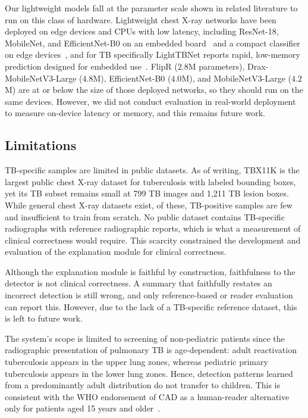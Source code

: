 \documentclass[conference, letterpaper]{IEEEtran}
\begin{document}
Our lightweight models fall at the parameter scale shown in related literature to run on this class of hardware. Lightweight chest X-ray networks have been deployed on edge devices and CPUs with low latency, including ResNet-18, MobileNet, and EfficientNet-B0 on an embedded board~\cite{benmalek2025edge} and a compact classifier on edge devices~\cite{chauhan2024covid_edge}, and for TB specifically LightTBNet reports rapid, low-memory prediction designed for embedded use~\cite{capellan2023lighttbnet}. FlipR ($2.8$M parameters), Drax-MobileNetV3-Large ($4.8$M), EfficientNet-B0 ($4.0$M), and MobileNetV3-Large ($4.2$M) are at or below the size of those deployed networks, so they should run on the same devices. However, we did not conduct evaluation in real-world deployment to measure on-device latency or memory, and this remains future work.

\subsection{Limitations}

TB-specific samples are limited in public datasets. As of writing, TBX11K is the largest public chest X-ray dataset for tuberculosis with labeled bounding boxes, yet its TB subset remains small at 799 TB images and 1,211 TB lesion boxes. While general chest X-ray datasets exist, of these, TB-positive samples are few and insufficient to train from scratch. No public dataset contains TB-specific radiographs with reference radiographic reports, which is what a measurement of clinical correctness would require. This scarcity constrained the development and evaluation of the explanation module for clinical correctness.

Although the explanation module is faithful by construction, faithfulness to the detector is not clinical correctness. A summary that faithfully restates an incorrect detection is still wrong, and only reference-based or reader evaluation can report this. However, due to the lack of a TB-specific reference dataset, this is left to future work.

The system's scope is limited to screening of non-pediatric patients since the radiographic presentation of pulmonary TB is age-dependent: adult reactivation tuberculosis appears in the upper lung zones, whereas pediatric primary tuberculosis appears in the lower lung zones. Hence, detection patterns learned from a predominantly adult distribution do not transfer to children. This is consistent with the WHO endorsement of CAD as a human-reader alternative only for patients aged 15 years and older~\cite{who_cad_policy_2021}. 
\end{document}
